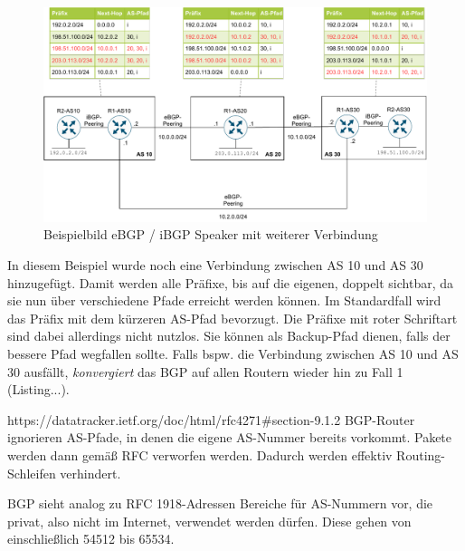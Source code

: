 \begin{figure}[h]
  \centering
  \includegraphics{Figures/ebgp_peerings_additional_connection.pdf}
  \caption{Beispielbild eBGP / iBGP Speaker mit weiterer Verbindung}
  \label{grafik: ebgp_peerings_additional_connection}
\end{figure}\FloatBarrier

In diesem Beispiel wurde noch eine Verbindung zwischen AS 10 und AS 30 hinzugefügt. Damit werden alle Präfixe, bis auf die eigenen, doppelt sichtbar, da sie nun über verschiedene Pfade erreicht werden können. Im Standardfall wird das Präfix mit dem kürzeren AS-Pfad bevorzugt. Die Präfixe mit roter Schriftart sind dabei allerdings nicht nutzlos. Sie können als Backup-Pfad dienen, falls der bessere Pfad wegfallen sollte. Falls bspw. die Verbindung zwischen AS 10 und AS 30 ausfällt, \textit{konvergiert} das BGP auf allen Routern wieder hin zu Fall 1 (Listing...).

https://datatracker.ietf.org/doc/html/rfc4271#section-9.1.2
BGP-Router ignorieren AS-Pfade, in denen die eigene AS-Nummer bereits vorkommt. Pakete werden dann gemäß RFC verworfen werden. Dadurch werden effektiv Routing-Schleifen verhindert.

BGP sieht analog zu RFC 1918-Adressen Bereiche für AS-Nummern vor, die privat, also nicht im Internet, verwendet werden dürfen. Diese gehen von einschließlich 54512 bis 65534.





